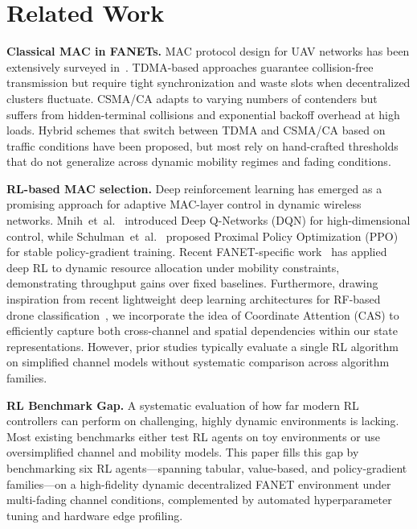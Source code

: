 
\section{Related Work}
\label{sec:related}

\textbf{Classical MAC in FANETs.}
MAC protocol design for UAV networks has been extensively surveyed in~\cite{li2024uavmac}. TDMA-based approaches guarantee collision-free transmission but require tight synchronization and waste slots when decentralized clusters fluctuate. CSMA/CA adapts to varying numbers of contenders but suffers from hidden-terminal collisions and exponential backoff overhead at high loads. Hybrid schemes that switch between TDMA and CSMA/CA based on traffic conditions have been proposed, but most rely on hand-crafted thresholds that do not generalize across dynamic mobility regimes and fading conditions.

\textbf{RL-based MAC selection.}
Deep reinforcement learning has emerged as a promising approach for adaptive MAC-layer control in dynamic wireless networks. Mnih~et~al.~\cite{mnih2015dqn} introduced Deep Q-Networks (DQN) for high-dimensional control, while Schulman~et~al.~\cite{schulman2017ppo} proposed Proximal Policy Optimization (PPO) for stable policy-gradient training. Recent FANET-specific work~\cite{zhao2025fanetrl} has applied deep RL to dynamic resource allocation under mobility constraints, demonstrating throughput gains over fixed baselines. Furthermore, drawing inspiration from recent lightweight deep learning architectures for RF-based drone classification~\cite{cnn2026drone}, we incorporate the idea of Coordinate Attention (CAS) to efficiently capture both cross-channel and spatial dependencies within our state representations. However, prior studies typically evaluate a single RL algorithm on simplified channel models without systematic comparison across algorithm families.

\textbf{RL Benchmark Gap.}
A systematic evaluation of how far modern RL controllers can perform on challenging, highly dynamic environments is lacking. Most existing benchmarks either test RL agents on toy environments or use oversimplified channel and mobility models. This paper fills this gap by benchmarking six RL agents---spanning tabular, value-based, and policy-gradient families---on a high-fidelity dynamic decentralized FANET environment under multi-fading channel conditions, complemented by automated hyperparameter tuning and hardware edge profiling.
